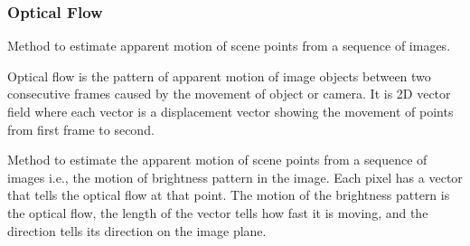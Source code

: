 \begin{frame}
  \frametitle{Optical Flow}

  Method to estimate apparent motion of scene points from a sequence of images.

  Optical flow is the pattern of apparent motion of image objects between two consecutive frames caused by the movement of object or camera. It is 2D vector field where each vector is a displacement vector showing the movement of points from first frame to second.

  Method to estimate the apparent motion of scene points from a sequence of images i.e., the motion of brightness pattern in the image. Each pixel has a vector that tells the optical flow at that point. The motion of the brightness pattern is the optical flow, the length of the vector tells how fast it is moving, and the direction tells its direction on the image plane.


\end{frame}
